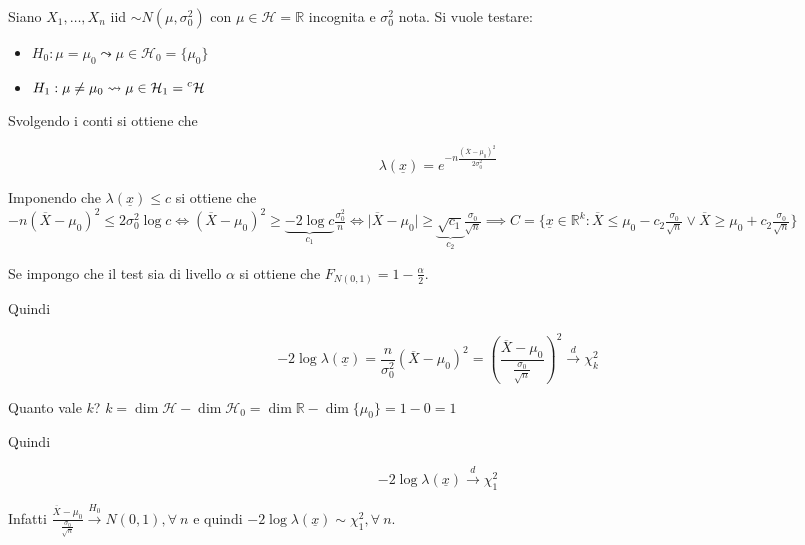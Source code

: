 \documentclass[hidelinks, 10pt]{report}
\begin{document}
\begin{es}
Siano $ X_{1}, \dotsc, X_{n} $ iid $ \sim N(\mu, \sigma_{0}^{2}) $ con $ \mu \in \mathcal{H} = \mathbb{R} $ incognita e $ \sigma_{0}^{2} $ nota. Si vuole testare:
\begin{itemize}
\item $ H_{0}: \mu = \mu_{0} \leadsto \mu \in \mathcal{H}_{0} = \{ \mu_{0} \} $
\item $ H_{1}: \mu \ne \mu_{0} \leadsto \mu \in \mathcal{H}_{1} = \prescript{c}{}{\mathcal{H}} $
\end{itemize}

Svolgendo i conti si ottiene che

\[ \lambda(\underline{x}) = e^{- n \frac{(\overline{X} - \mu_{0})^{2}}{2 \sigma_{0}^{2}}} \]

Imponendo che $ \lambda (\underline{x}) \le c $ si ottiene che $ - n(\overline{X} - \mu_{0})^{2} \le 2 \sigma_{0}^{2} \log c \iff (\overline{X}- \mu_{0})^{2} \ge \underbrace{-2 \log c}_{c_{1}} \frac{\sigma_{0}^{2}}{n} \iff \vert \overline{X} - \mu_{0} \vert \ge \underbrace{\sqrt{c_{1}}}_{c_{2}} \frac{\sigma_{0}}{\sqrt{n}} \implies C = \{ \underline{x} \in \mathbb{R}^{k} : \overline{X} \le \mu_{0} - c_{2} \frac{\sigma_{0}}{\sqrt{n}} \lor \overline{X} \ge \mu_{0} + c_{2} \frac{\sigma_{0}}{\sqrt{n}} \} $

Se impongo che il test sia di livello $ \alpha $ si ottiene che $ F_{N(0,1)} = 1 - \frac{\alpha}{2} $.

Quindi

\[ - 2 \log \lambda (\underline{x}) = \frac{n}{\sigma_{0}^{2}} (\overline{X} - \mu_{0})^{2} = \left( \frac{\overline{X} - \mu_{0}}{\frac{\sigma_{0}}{\sqrt{n}}} \right)^{2} \stackrel{d}{\to} \chi^{2}_{k} \]

Quanto vale $ k $? $ k = \dim \mathcal{H} - \dim \mathcal{H}_{0} = \dim \mathbb{R} - \dim \{ \mu_{0} \} = 1 - 0 = 1 $

Quindi 

\[ - 2 \log \lambda (\underline{x}) \stackrel{d}{\to} \chi^{2}_{1} \]

Infatti $ \frac{\overline{X} - \mu_{0}}{\frac{\sigma_{0}}{\sqrt{n}}} \stackrel{H_{0}}{\to} N(0, 1), \forall\ n $ e quindi $ - 2 \log \lambda (\underline{x}) \sim \chi^{2}_{1}, \forall\ n $.
\end{es}
\end{document}
